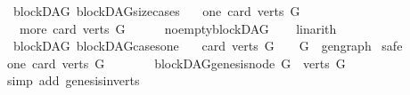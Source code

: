 \begin{isabellebody}
%
\endisatagproof
{\isafoldproof}%
%
\isadelimproof
\isanewline
%
\endisadelimproof
\isanewline
{}\isamarkupfalse%
\ {\isacharparenleft}{\kern0pt}\ blockDAG{\isacharparenright}{\kern0pt}\ blockDAG{\isacharunderscore}{\kern0pt}size{\isacharunderscore}{\kern0pt}cases{\isacharcolon}{\kern0pt}\isanewline
\ \ \ {\isacharparenleft}{\kern0pt}one{\isacharparenright}{\kern0pt}\ {\isachardoublequoteopen}card\ {\isacharparenleft}{\kern0pt}verts\ G{\isacharparenright}{\kern0pt}\ {\isacharequal}{\kern0pt}\ {}{\isachardoublequoteclose}\ \isanewline
\ \ {\isacharbar}{\kern0pt}\ {\isacharparenleft}{\kern0pt}more{\isacharparenright}{\kern0pt}\ {\isachardoublequoteopen}card\ {\isacharparenleft}{\kern0pt}verts\ G{\isacharparenright}{\kern0pt}\ {\isachargreater}{\kern0pt}\ {}{\isachardoublequoteclose}\isanewline
%
\isadelimproof
\ \ %
\endisadelimproof
%
\isatagproof
{}\isamarkupfalse%
\ no{\isacharunderscore}{\kern0pt}empty{\isacharunderscore}{\kern0pt}blockDAG\isanewline
\ \ \isamarkupfalse%
\ linarith%
\endisatagproof
{\isafoldproof}%
%
\isadelimproof
\ \isanewline
%
\endisadelimproof
\isanewline
{}\isamarkupfalse%
\ {\isacharparenleft}{\kern0pt}\ blockDAG{\isacharparenright}{\kern0pt}\ blockDAG{\isacharunderscore}{\kern0pt}cases{\isacharunderscore}{\kern0pt}one{\isacharcolon}{\kern0pt}\isanewline
\ \ \ {\isachardoublequoteopen}card\ {\isacharparenleft}{\kern0pt}verts\ G{\isacharparenright}{\kern0pt}\ {\isacharequal}{\kern0pt}\ {}\ {\isasymlongrightarrow}\ {\isacharparenleft}{\kern0pt}G\ {\isacharequal}{\kern0pt}\ gen{\isacharunderscore}{\kern0pt}graph{\isacharparenright}{\kern0pt}{\isachardoublequoteclose}\isanewline
%
\isadelimproof
%
\endisadelimproof
%
\isatagproof
{}\isamarkupfalse%
\ {\isacharparenleft}{\kern0pt}safe{\isacharparenright}{\kern0pt}\isanewline
\ \ \isamarkupfalse%
\ one{\isacharcolon}{\kern0pt}\ {\isachardoublequoteopen}card\ {\isacharparenleft}{\kern0pt}verts\ G{\isacharparenright}{\kern0pt}\ {\isacharequal}{\kern0pt}\ {}{\isachardoublequoteclose}\isanewline
\ \ \isamarkupfalse%
\ \isamarkupfalse%
\ {\isachardoublequoteopen}blockDAG{\isachardot}{\kern0pt}genesis{\isacharunderscore}{\kern0pt}node\ G\ {\isasymin}\ verts\ G{\isachardoublequoteclose}\isanewline
\ \ \ \ \isamarkupfalse%
\ {\isacharparenleft}{\kern0pt}simp\ add{\isacharcolon}{\kern0pt}\ genesis{\isacharunderscore}{\kern0pt}in{\isacharunderscore}{\kern0pt}verts{\isacharparenright}{\kern0pt}\isanewline

\end{isabellebody}
